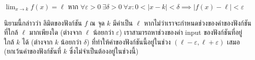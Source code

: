 \begin{definition}
$\lim_{x\to k}{f(x)}=\ell$ หาก $\forall\varepsilon>0\ \exists\delta>0\ \forall x: 0<|x-k|<\delta\implies|f(x)-\ell|<\varepsilon$
\end{definition}
นิยามนี้กล่าวว่า ลิมิตของฟังก์ชัน $f$ ณ จุด $k$ มีค่าเป็น $\ell$ หากไม่ว่าเราจะกำหนดช่วงของค่าของฟังก์ชันที่ใกล้ $\ell$ มากเพียงใด (ต่างจาก $\ell$ น้อยกว่า $\varepsilon$) เราสามารถหาช่วงของค่า input ของฟังก์ชันที่อยู่ใกล้ $k$ ได้ (ต่างจาก $k$ น้อยกว่า $\delta$) ที่ทำให้ค่าของฟังก์ชันนี้อยู่ในช่วง $(\ell-\varepsilon,\ell+\varepsilon)$ เสมอ (ยกเว้นค่าของฟังก์ชันที่ $k$ ซึ่งไม่จำเป็นต้องอยู่ในช่วงนี้)
